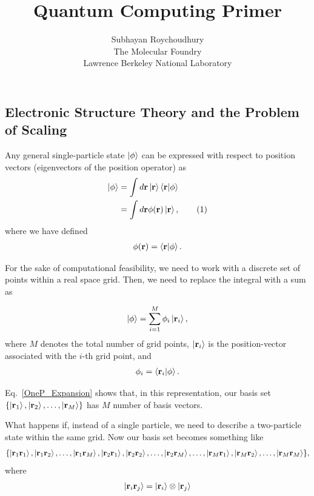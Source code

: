 \documentclass[12pt,oneside]{book}
\title{Quantum Computing Primer}
\author{Subhayan Roychoudhury\\ The Molecular Foundry\\ Lawrence Berkeley National Laboratory}
\date{}
\newcommand\numberthis{\addtocounter{equation}{1}\tag{\theequation}}
\begin{document}
\maketitle

\subsection*{Electronic Structure Theory and the Problem of Scaling}

Any general single-particle state $\ket{\phi}$ can be expressed with respect to position vectors (eigenvectors of the position operator) as
\begin{align*}
    \ket{\phi} &{}= \int d \mathbf{r} \ket{\mathbf{r}}\braket{\mathbf{r}|\phi}\\
    &{} = \int d\mathbf{r} \phi(\mathbf{r})\ket{\mathbf{r}}, \numberthis
\end{align*}
where we have defined
\begin{align}
    \phi(\mathbf{r})= \braket{\mathbf{r}|\phi}.
\end{align}

For the sake of computational feasibility, we need to work with a discrete set of points within a real space grid. Then, we need to replace the integral with a sum as

\begin{align}\label{OneP_Expansion}
    \ket{\phi} = \sum_{i=1}^M \phi_i \ket{\mathbf{r}_i},
\end{align}
where $M$ denotes the total number of grid points, $\ket{\mathbf{r}_i}$ is the position-vector associated with the $i$-th grid point, and 
\begin{align}
    \phi_i=\braket{\mathbf{r}_i|\phi}.
\end{align}

Eq.~\ref{OneP_Expansion} shows that, in this representation, our basis set $\{\ket{\mathbf{r}_1}, \ket{\mathbf{r}_2},\hdots, \ket{\mathbf{r}_M}\}$ has $M$ number of basis vectors.

What happens if, instead of a single particle, we need to describe a two-particle state within the same grid. Now our basis set becomes something like
\begin{align*}
    \{\ket{\mathbf{r}_1\mathbf{r}_1}, \ket{\mathbf{r}_1\mathbf{r}_2} , \hdots , \ket{\mathbf{r}_1\mathbf{r}_M}, \ket{\mathbf{r}_2\mathbf{r}_1} , \ket{\mathbf{r}_2\mathbf{r}_2}, \hdots , \ket{\mathbf{r}_2\mathbf{r}_M}, \hdots , \ket{\mathbf{r}_M\mathbf{r}_1}, \ket{\mathbf{r}_M\mathbf{r}_2}, \hdots , \ket{\mathbf{r}_M\mathbf{r}_M}\},
\end{align*}
where 
\begin{align*}
\ket{\mathbf{r}_i \mathbf{r}_j} = \ket{\mathbf{r}_i}\otimes\ket{\mathbf{r}_j}
\end{align*}
\end{document}
